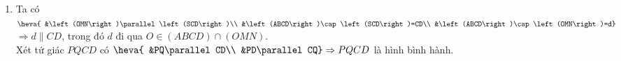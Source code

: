 \begin{ex}
{\begin{enumerate}
			 Như vậy $\heva{
			 &OM\parallel SC\\
			 &ON\parallel SD\\
			 &OM,\, ON\subset\left(OMN\right)\\
			&SC,\,  SD\subset\left(SCD\right)\\
			&OM\cap ON=O}$  $\Rightarrow\left(OMN\right)\parallel\left(SCD\right)$.
			 \item
			Ta có $\heva{ 
			 &\left(OMN\right)\parallel\left(SCD\right)\\
			 &\left(ABCD\right)\cap\left(SCD\right)=CD\\
			 &\left(ABCD\right)\cap\left(OMN\right)=d}$
			$\Rightarrow d\parallel CD$, trong đó $d$  đi qua $O\in\left(ABCD\right)\cap\left(OMN\right)$.\\
			Xét tứ giác  $PQCD$ có $\heva{
			&PQ\parallel CD\\ 
			 &PD\parallel CQ}\Rightarrow PQCD$ là hình bình hành.
		\end{enumerate}
	 }
\end{ex}

